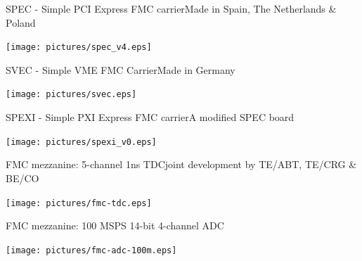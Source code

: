 \documentclass[compress,red]{beamer}
\begin{document}
\begin{frame}{SPEC - Simple PCI Express FMC carrier}{Made in Spain, The Netherlands \& Poland}

  \begin{center}
    \texttt{[image: pictures/spec\_v4.eps]}
  \end{center}

\end{frame}

\begin{frame}{SVEC - Simple VME FMC Carrier}{Made in Germany}

  \begin{center}
    \texttt{[image: pictures/svec.eps]}
  \end{center}

\end{frame}

\begin{frame}{SPEXI - Simple PXI Express FMC carrier}{A modified SPEC board}

  \begin{center}
    \texttt{[image: pictures/spexi\_v0.eps]}
  \end{center}

\end{frame}

\begin{frame}{FMC mezzanine: 5-channel 1ns TDC}{joint development by TE/ABT, TE/CRG \& BE/CO}

  \begin{center}
    \texttt{[image: pictures/fmc-tdc.eps]}
  \end{center}

\end{frame}

\begin{frame}{FMC mezzanine: 100 MSPS 14-bit 4-channel ADC}

  \begin{center}
    \texttt{[image: pictures/fmc-adc-100m.eps]}
  \end{center}

\end{frame}
\end{document}

